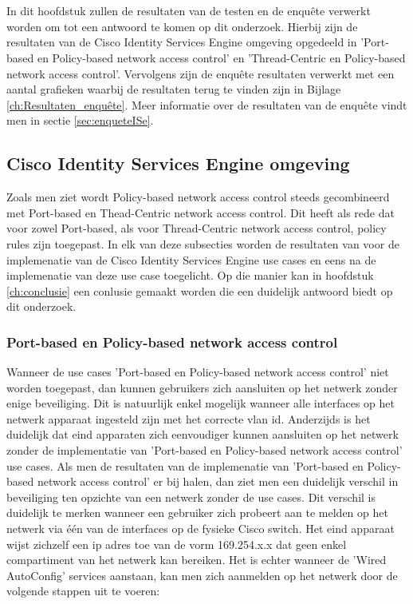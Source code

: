 
 \chapter{}
\label{ch:Resultaten}
In dit hoofdstuk zullen de resultaten van de testen en de enquête verwerkt worden om tot een antwoord te komen op dit onderzoek. Hierbij zijn de resultaten van de Cisco Identity Services Engine omgeving opgedeeld in 'Port-based en Policy-based network access control' en 'Thread-Centric en Policy-based network access control'. Vervolgens zijn de enquête resultaten verwerkt met een aantal grafieken waarbij de resultaten terug te vinden zijn in Bijlage \ref{ch:Resultaten_enquête}. Meer informatie over de resultaten van de enquête vindt men in sectie \ref{sec:enqueteISe}.

\section{Cisco Identity Services Engine omgeving}
Zoals men ziet wordt Policy-based network access control steeds gecombineerd met Port-based en Thead-Centric network access control. Dit heeft als rede dat voor zowel Port-based, als voor Thread-Centric network access control, policy rules zijn toegepast. In elk van deze subsecties worden de resultaten van voor de implemenatie van de Cisco Identity Services Engine use cases en eens na de implemenatie van deze use case toegelicht. Op die manier kan in hoofdstuk \ref{ch:conclusie} een conlusie gemaakt worden die een duidelijk antwoord biedt op dit onderzoek. 
\subsection{Port-based en Policy-based network access control}
Wanneer de use cases 'Port-based en Policy-based network access control' niet worden toegepast, dan kunnen gebruikers zich aansluiten op het netwerk zonder enige beveiliging. Dit is natuurlijk enkel mogelijk wanneer alle interfaces op het netwerk apparaat ingesteld zijn met het correcte vlan id. Anderzijds is het duidelijk dat eind apparaten zich eenvoudiger kunnen aansluiten op het netwerk zonder de implementatie van 'Port-based en Policy-based network access control' use cases.
Als men de resultaten van de implemenatie van 'Port-based en Policy-based network access control' er bij halen, dan ziet men een duidelijk verschil in beveiliging ten opzichte van een netwerk zonder de use cases. Dit verschil is duidelijk te merken wanneer een gebruiker zich probeert aan te melden op het netwerk via één van de interfaces op de fysieke Cisco switch. Het eind apparaat wijst zichzelf een ip adres toe van de vorm 169.254.x.x dat geen enkel compartiment van het netwerk kan bereiken. 
\newline
\newline
Het is echter wanneer de 'Wired AutoConfig' services aanstaan, kan men zich aanmelden op het netwerk door de volgende stappen uit te voeren: 

